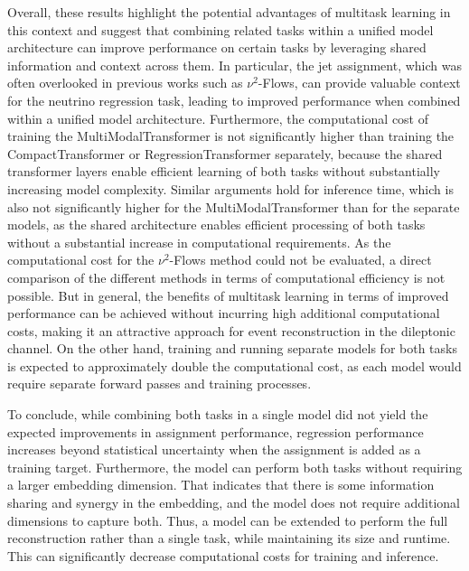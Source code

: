 Overall, these results highlight the potential advantages of multitask learning in this context and suggest that combining related tasks within a unified model architecture can improve performance on certain tasks by leveraging shared information and context across them. In particular, the jet assignment, which was often overlooked in previous works such as $\nu^2$-Flows, can provide valuable context for the neutrino regression task, leading to improved performance when combined within a unified model architecture. Furthermore, the computational cost of training the MultiModalTransformer is not significantly higher than training the CompactTransformer or RegressionTransformer separately, because the shared transformer layers enable efficient learning of both tasks without substantially increasing model complexity. Similar arguments hold for inference time, which is also not significantly higher for the MultiModalTransformer than for the separate models, as the shared architecture enables efficient processing of both tasks without a substantial increase in computational requirements. As the computational cost for the $\nu^2$-Flows method could not be evaluated, a direct comparison of the different methods in terms of computational efficiency is not possible. But in general, the benefits of multitask learning in terms of improved performance can be achieved without incurring high additional computational costs, making it an attractive approach for event reconstruction in the dileptonic \ttbar channel. On the other hand, training and running separate models for both tasks is expected to approximately double the computational cost, as each model would require separate forward passes and training processes.

To conclude, while combining both tasks in a single model did not yield the expected improvements in assignment performance, regression performance increases beyond statistical uncertainty when the assignment is added as a training target. Furthermore, the model can perform both tasks without requiring a larger embedding dimension. That indicates that there is some information sharing and synergy in the embedding, and the model does not require additional dimensions to capture both.
Thus, a model can be extended to perform the full reconstruction rather than a single task, while maintaining its size and runtime. This can significantly decrease computational costs for training and inference.

